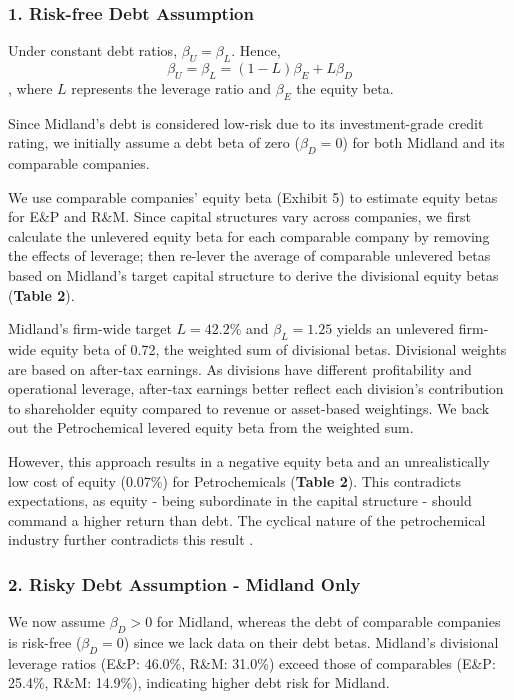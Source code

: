 \documentclass[AER]{AEA}
\begin{document}
\begin{spacing}{1.5}
\subsubsection{1. Risk-free Debt Assumption}

Under constant debt ratios, $\beta_U =\beta_L$. Hence, \begin{equation}
    \beta_U =\beta_L= (1-L)\beta_E+L\beta_D\label{eq:1}
\end{equation}, where $L$ represents the leverage ratio and $\beta_E$ the equity beta. 

Since Midland's debt is considered low-risk due to its investment-grade credit rating, we initially assume a debt beta of zero ($\beta_D = 0$) for both Midland and its comparable companies.

We use comparable companies' equity beta (Exhibit 5) to estimate equity betas for E\&P and R\&M. Since capital structures vary across companies, we first calculate the unlevered equity beta for each comparable company by removing the effects of leverage; then re-lever the average of comparable unlevered betas based on Midland's target capital structure to derive the divisional equity betas (\textbf{Table 2}).

Midland's firm-wide target $L = 42.2\%$ and $\beta_L =  1.25$ yields an unlevered firm-wide equity beta of 0.72, the weighted sum of divisional betas. Divisional weights are based on after-tax earnings. As divisions have different profitability and operational leverage, after-tax earnings better reflect each division's contribution to shareholder equity compared to revenue or asset-based weightings. We back out the Petrochemical levered equity beta from the weighted sum.

However, this approach results in a negative equity beta and an unrealistically low cost of equity (0.07\%) for Petrochemicals (\textbf{Table 2}). This contradicts expectations, as equity - being subordinate in the capital structure - should command a higher return than debt. The cyclical nature of the petrochemical industry further contradicts this result \parencite[]{Park_Huang_Hsu_Kim_Nagashima_2024}.

\subsubsection{2. Risky Debt Assumption - Midland Only}\label{final}

We now assume $\beta_D>0$ for Midland, whereas the debt of comparable companies is risk-free ($\beta_D=0$) since we lack data on their debt betas. Midland's divisional leverage ratios (E\&P: 46.0\%, R\&M: 31.0\%) exceed those of comparables (E\&P: 25.4\%, R\&M: 14.9\%), indicating higher debt risk for Midland.


\end{spacing}
\end{document}
